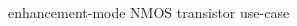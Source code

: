 \documentclass[10pt,a4paper,oneside]{article}
\begin{document}
\begin{center}
	\begin{figure}[h]
		\begin{center}
			\begin{circuitdiagram}{20}{20}
			\end{circuitdiagram}
		\end{center}
		\caption{enhancement-mode NMOS transistor use-case}
	\end{figure}
\end{center}
\end{document}
